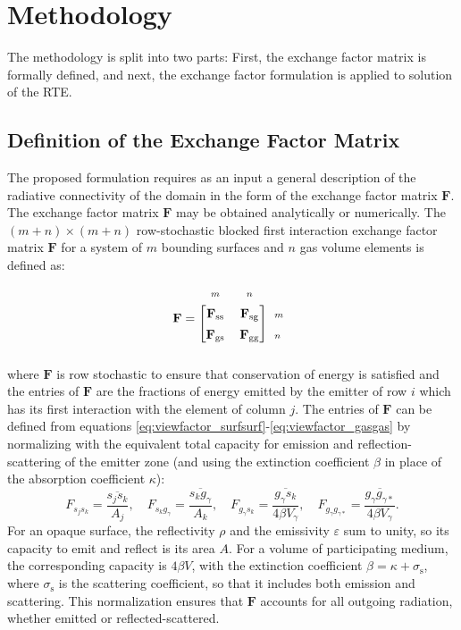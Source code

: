\documentclass[preprint,1p,times]{elsarticle}
\theoremstyle{plain}
\theoremstyle{definition}
\theoremstyle{remark}
\begin{document}
\section{Methodology}
\label{sec:methodology1}

The methodology is split into two parts: First, the exchange factor matrix is formally defined, and next, the exchange factor formulation is applied to solution of the RTE.

\subsection{Definition of the Exchange Factor Matrix}

The proposed formulation requires as an input a general description of the radiative connectivity of the domain in the form of the exchange factor matrix $\mathbf{F}$. The exchange factor matrix $\mathbf{F}$ may be obtained analytically or numerically. The $(m+n)\times(m+n)$ row-stochastic blocked first interaction exchange factor matrix $\mathbf{F}$ for a system of $m$ bounding surfaces and $n$ gas volume elements is defined as:
\begin{equation}
	\renewcommand{\arraystretch}{1.4}
	\mathbf{F} =
	\begin{blockarray}{ccl}
	\scriptstyle m & \scriptstyle n & \\
	\begin{block}{[cc]l}
	\mathbf{F}_\mathrm{ss} & \mathbf{F}_\mathrm{sg} & \scriptstyle m \\
	\mathbf{F}_\mathrm{gs} & \mathbf{F}_\mathrm{gg} & \scriptstyle n \\
	\end{block}
	\end{blockarray}
\end{equation}
where $\mathbf{F}$ is row stochastic to ensure that conservation of energy is satisfied and the entries of $\mathbf{F}$ are the fractions of energy emitted by the emitter of row $i$ which has its first interaction with the element of column $j$. The entries of $\mathbf{F}$ can be defined from equations \eqref{eq:viewfactor_surfsurf}-\eqref{eq:viewfactor_gasgas} by normalizing with the equivalent total capacity for emission and reflection-scattering of the emitter zone (and using the extinction coefficient $\beta$ in place of the absorption coefficient $\kappa$):
\begin{equation}
	F_{s_j s_k} = \frac{\overline{s_j s_k}}{A_j}, \quad
	F_{s_k g_\gamma} = \frac{\overline{s_k g_\gamma}}{A_k}, \quad
	F_{g_\gamma s_k} = \frac{\overline{g_\gamma s_k}}{4\beta V_\gamma}, \quad
	F_{g_\gamma g_{\gamma*}} = \frac{\overline{g_\gamma g_{\gamma*}}}{4\beta V_\gamma}.
\end{equation}
For an opaque surface, the reflectivity $\rho$ and the emissivity $\varepsilon$ sum to unity, so its capacity to emit and reflect is its area $A$. For a volume of participating medium, the corresponding capacity is $4\beta V$, with the extinction coefficient $\beta = \kappa + \sigma_\mathrm{s}$, where $\sigma_\mathrm{s}$ is the scattering coefficient, so that it includes both emission and scattering. This normalization ensures that $\mathbf{F}$ accounts for all outgoing radiation, whether emitted or reflected-scattered.
\end{document}
